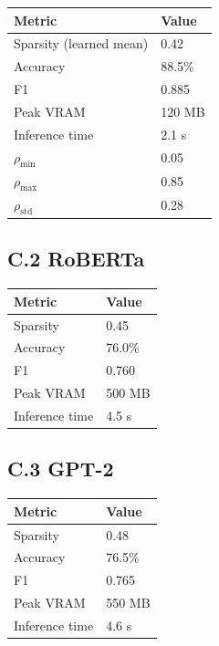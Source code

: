 \begin{table}[H]
\centering
\small
\begin{tabular}{ll}
\toprule
\textbf{Metric} & \textbf{Value} \\
\midrule
Sparsity (learned mean) & 0.42 \\
Accuracy & 88.5\% \\
F1 & 0.885 \\
Peak VRAM & 120 MB \\
Inference time & 2.1 s \\
$\rho_\text{min}$ & 0.05 \\
$\rho_\text{max}$ & 0.85 \\
$\rho_\text{std}$ & 0.28 \\
\bottomrule
\end{tabular}
\end{table}

\subsection{C.2 RoBERTa}

\begin{table}[H]
\centering
\small
\begin{tabular}{ll}
\toprule
\textbf{Metric} & \textbf{Value} \\
\midrule
Sparsity & 0.45 \\
Accuracy & 76.0\% \\
F1 & 0.760 \\
Peak VRAM & 500 MB \\
Inference time & 4.5 s \\
\bottomrule
\end{tabular}
\end{table}

\subsection{C.3 GPT-2}

\begin{table}[H]
\centering
\small
\begin{tabular}{ll}
\toprule
\textbf{Metric} & \textbf{Value} \\
\midrule
Sparsity & 0.48 \\
Accuracy & 76.5\% \\
F1 & 0.765 \\
Peak VRAM & 550 MB \\
Inference time & 4.6 s \\
\bottomrule
\end{tabular}
\end{table}

